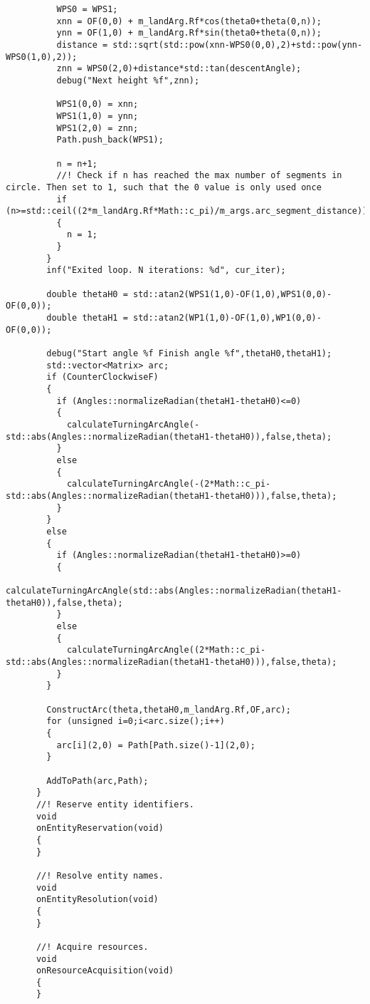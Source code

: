 \begin{frame}[fragile]
\begin{lstlisting}
          WPS0 = WPS1;
          xnn = OF(0,0) + m_landArg.Rf*cos(theta0+theta(0,n));
          ynn = OF(1,0) + m_landArg.Rf*sin(theta0+theta(0,n));
          distance = std::sqrt(std::pow(xnn-WPS0(0,0),2)+std::pow(ynn-WPS0(1,0),2));
          znn = WPS0(2,0)+distance*std::tan(descentAngle);
          debug("Next height %f",znn);

          WPS1(0,0) = xnn;
          WPS1(1,0) = ynn;
          WPS1(2,0) = znn;
          Path.push_back(WPS1);

          n = n+1;
          //! Check if n has reached the max number of segments in circle. Then set to 1, such that the 0 value is only used once
          if (n>=std::ceil((2*m_landArg.Rf*Math::c_pi)/m_args.arc_segment_distance))
          {
            n = 1;
          }
        }
        inf("Exited loop. N iterations: %d", cur_iter);

        double thetaH0 = std::atan2(WPS1(1,0)-OF(1,0),WPS1(0,0)-OF(0,0));
        double thetaH1 = std::atan2(WP1(1,0)-OF(1,0),WP1(0,0)-OF(0,0));

        debug("Start angle %f Finish angle %f",thetaH0,thetaH1);
        std::vector<Matrix> arc;
        if (CounterClockwiseF)
        {
          if (Angles::normalizeRadian(thetaH1-thetaH0)<=0)
          {
            calculateTurningArcAngle(-std::abs(Angles::normalizeRadian(thetaH1-thetaH0)),false,theta);
          }
          else
          {
            calculateTurningArcAngle(-(2*Math::c_pi-std::abs(Angles::normalizeRadian(thetaH1-thetaH0))),false,theta);
          }
        }
        else
        {
          if (Angles::normalizeRadian(thetaH1-thetaH0)>=0)
          {
            calculateTurningArcAngle(std::abs(Angles::normalizeRadian(thetaH1-thetaH0)),false,theta);
          }
          else
          {
            calculateTurningArcAngle((2*Math::c_pi-std::abs(Angles::normalizeRadian(thetaH1-thetaH0))),false,theta);
          }
        }

        ConstructArc(theta,thetaH0,m_landArg.Rf,OF,arc);
        for (unsigned i=0;i<arc.size();i++)
        {
          arc[i](2,0) = Path[Path.size()-1](2,0);
        }

        AddToPath(arc,Path);
      }
      //! Reserve entity identifiers.
      void
      onEntityReservation(void)
      {
      }

      //! Resolve entity names.
      void
      onEntityResolution(void)
      {
      }

      //! Acquire resources.
      void
      onResourceAcquisition(void)
      {
      }


\end{lstlisting}
\end{frame}
